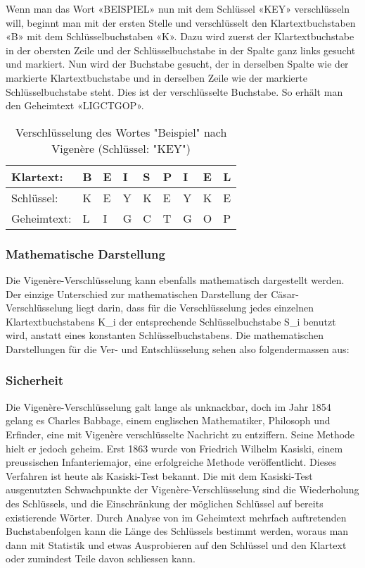 Wenn man das Wort «BEISPIEL» nun mit dem Schlüssel «KEY» verschlüsseln will, beginnt man mit der ersten Stelle und verschlüsselt den Klartextbuchstaben «B» mit dem Schlüsselbuchstaben «K». Dazu wird zuerst der Klartextbuchstabe in der obersten Zeile und der Schlüsselbuchstabe in der Spalte ganz links gesucht und markiert. Nun wird der Buchstabe gesucht, der in derselben Spalte wie der markierte Klartextbuchstabe und in derselben Zeile wie der markierte Schlüsselbuchstabe steht. Dies ist der verschlüsselte Buchstabe. So erhält man den Geheimtext «LIGCTGOP».

\begin{table}[]
\centering
\caption{Verschlüsselung des Wortes "Beispiel" nach Vigenère (Schlüssel: "KEY")}
\label{tab:verschluesselung-vigenere-beispiel-key}
\begin{tabular}{|l|llllllll|}
\hline
Klartext:   & B & E & I & S & P & I & E & L \\ \hline
Schlüssel:  & K & E & Y & K & E & Y & K & E \\ \hline
Geheimtext: & L & I & G & C & T & G & O & P \\ \hline
\end{tabular}%
\end{table}


\subsubsection{Mathematische Darstellung}
\label{sec:v-mathematische-darstellung}
Die Vigenère-Verschlüsselung kann ebenfalls mathematisch dargestellt werden. Der einzige Unterschied zur mathematischen Darstellung der Cäsar-Verschlüsselung liegt darin, dass für die Verschlüsselung jedes einzelnen Klartextbuchstabens K\_{i} der entsprechende Schlüsselbuchstabe S\_{i} benutzt wird, anstatt eines konstanten Schlüsselbuchstabens. Die mathematischen Darstellungen für die Ver- und Entschlüsselung sehen also folgendermassen aus:




\subsubsection{Sicherheit}
\label{sec:v-sicherheit}
Die Vigenère-Verschlüsselung galt lange als unknackbar, doch im Jahr 1854 gelang es Charles Babbage, einem englischen Mathematiker, Philosoph und Erfinder, eine mit Vigenère verschlüsselte Nachricht zu entziffern. Seine Methode hielt er jedoch geheim. Erst 1863 wurde von Friedrich Wilhelm Kasiski, einem preussischen Infanteriemajor, eine erfolgreiche Methode veröffentlicht. Dieses Verfahren ist heute als Kasiski-Test bekannt. Die mit dem Kasiski-Test ausgenutzten Schwachpunkte der Vigenère-Verschlüsselung sind die Wiederholung des Schlüssels, und die Einschränkung der möglichen Schlüssel auf bereits existierende Wörter. Durch Analyse von im Geheimtext mehrfach auftretenden Buchstabenfolgen kann die Länge des Schlüssels bestimmt werden, woraus man dann mit Statistik und etwas Ausprobieren auf den Schlüssel und den Klartext oder zumindest Teile davon schliessen kann.

